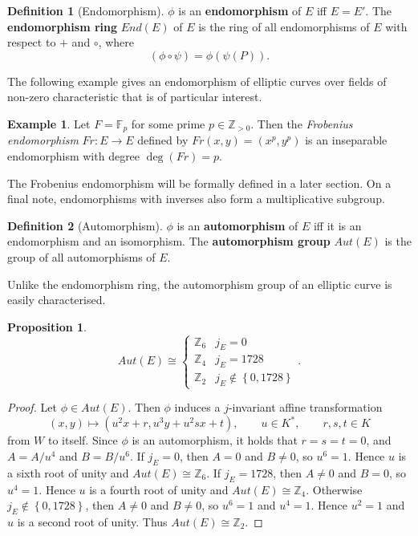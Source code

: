 \documentclass{article}
\newcommand{\F}{\mathbb{F}}
\newcommand{\Z}{\mathbb{Z}}
\newcommand{\rb}[1]{\left( #1 \right)}
\newcommand{\cb}[1]{\left\{ #1 \right\}}
\theoremstyle{definition}
\newtheorem*{definition}{Definition}
\newtheorem*{example}{Example}
\newtheorem{proposition}{Proposition}[subsection]
\begin{document}
\begin{definition}[Endomorphism]
$ \phi $ is an \textbf{endomorphism} of $ E $ iff $ E = E' $. The \textbf{endomorphism ring} $ End\rb{E} $ of $ E $ is the ring of all endomorphisms of $ E $ with respect to $ + $ and $ \circ $, where
$$ \rb{\phi \circ \psi} = \phi\rb{\psi\rb{P}}. $$
\end{definition}

The following example gives an endomorphism of elliptic curves over fields of non-zero characteristic that is of particular interest.

\begin{example}
Let $ F = \F_p $ for some prime $ p \in \Z_{> 0} $. Then the \emph{Frobenius endomorphism} $ Fr : E \to E $ defined by $ Fr\rb{x, y} = \rb{x^p, y^p} $ is an inseparable endomorphism with degree $ \deg\rb{Fr} = p $.
\end{example}

The Frobenius endomorphism will be formally defined in a later section. On a final note, endomorphisms with inverses also form a multiplicative subgroup.

\begin{definition}[Automorphism]
$ \phi $ is an \textbf{automorphism} of $ E $ iff it is an endomorphism and an isomorphism. The \textbf{automorphism group} $ Aut\rb{E} $ is the group of all automorphisms of $ E $.
\end{definition}

Unlike the endomorphism ring, the automorphism group of an elliptic curve is easily characterised.

\begin{proposition}
$$ Aut\rb{E} \cong \begin{cases} \Z_6 & j_E = 0 \\ \Z_4 & j_E = 1728 \\ \Z_2 & j_E \notin \cb{0, 1728} \end{cases}. $$
\end{proposition}

\begin{proof}
Let $ \phi \in Aut\rb{E} $. Then $ \phi $ induces a $ j $-invariant affine transformation
$$ \rb{x, y} \mapsto \rb{u^2x + r, u^3y + u^2sx + t}, \qquad u \in K^*, \qquad r, s, t \in K $$
from $ W $ to itself. Since $ \phi $ is an automorphism, it holds that $ r = s = t = 0 $, and $ A = A / u^4 $ and $ B = B / u^6 $. If $ j_E = 0 $, then $ A = 0 $ and $ B \ne 0 $, so $ u^6 = 1 $. Hence $ u $ is a sixth root of unity and $  Aut\rb{E} \cong \Z_6 $. If $ j_E = 1728 $, then $ A \ne 0 $ and $ B = 0 $, so $ u^4 = 1 $. Hence $ u $ is a fourth root of unity and $ Aut\rb{E} \cong \Z_4 $. Otherwise $ j_E \notin \cb{0, 1728} $, then $ A \ne 0 $ and $ B \ne 0 $, so $ u^6 = 1 $ and $ u^4 = 1 $. Hence $ u^2 = 1 $ and $ u $ is a second root of unity. Thus $ Aut\rb{E} \cong \Z_2 $.
\end{proof}
\end{document}
